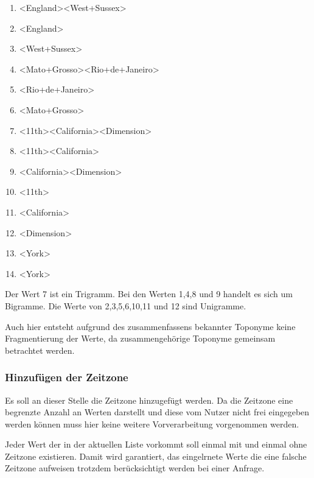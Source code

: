 				\begin{multicols}{2}
					\begin{enumerate}
						\item \textless England\textgreater   \textless West+Sussex\textgreater  
						\item \textless England\textgreater  
						\item \textless West+Sussex\textgreater  
						\item \textless Mato+Grosso\textgreater   \textless Rio+de+Janeiro\textgreater  
						\item \textless Rio+de+Janeiro\textgreater  
						\item \textless Mato+Grosso\textgreater  
						\item \textless 11th\textgreater   \textless California\textgreater   \textless Dimension\textgreater   
						\item \textless 11th\textgreater   \textless California\textgreater  
						\item \textless California\textgreater   \textless Dimension\textgreater   
						\item \textless 11th\textgreater  
						\item \textless California\textgreater  
						\item \textless Dimension\textgreater   
						\item \textless York\textgreater  
						\item \textless York\textgreater  
					\end{enumerate}
				\end{multicols}
				 Der Wert 7 ist ein Trigramm.
				 Bei den Werten 1,4,8 und 9 handelt es sich um Bigramme. 
				 Die Werte von 2,3,5,6,10,11 und 12 sind Unigramme.

				Auch hier entsteht aufgrund des zusammenfassens bekannter Toponyme keine Fragmentierung der Werte, da zusammengehörige Toponyme gemeinsam betrachtet werden.

			\subsubsection{Hinzufügen der Zeitzone}

				Es soll an dieser Stelle die Zeitzone hinzugefügt werden.
				Da die Zeitzone eine begrenzte Anzahl an Werten darstellt und diese vom Nutzer nicht frei eingegeben werden können muss hier keine weitere Vorverarbeitung vorgenommen werden.

				Jeder Wert der in der aktuellen Liste vorkommt soll einmal mit und einmal ohne Zeitzone existieren. 
				Damit wird garantiert, das eingelrnete Werte die eine falsche Zeitzone aufweisen trotzdem berücksichtigt werden bei einer Anfrage. 


